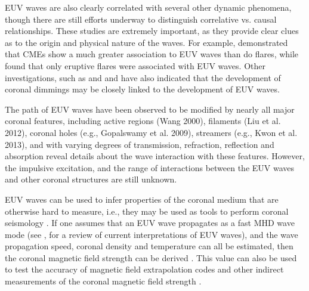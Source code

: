 EUV waves are also clearly correlated with several other dynamic
phenomena, though there are still efforts underway to distinguish
correlative vs. causal relationships.  These studies are extremely
important, as they provide clear clues as to the origin and physical
nature of the waves.  For example, \cite{2002ApJ...569.1009B}
demonstrated that CMEs show a much greater association to EUV waves
than do flares, while \cite{2006ApJ...641L.153} found that only
eruptive flares were associated with EUV waves.  Other investigations,
such as \cite{2000SoPh..193..161T} and \cite{2004A&A...427..705Z} and
\cite{2010ApJ...709..369P} have also indicated that the development of
coronal dimmings may be closely linked to the development of EUV
waves.

The path of EUV waves have been observed to be modified by nearly all
major coronal features, including active regions (Wang 2000),
filaments (Liu et al. 2012), coronal holes (e.g., Gopalswamy et
al. 2009), streamers (e.g., Kwon et al. 2013), and with varying
degrees of transmission, refraction, reflection and absorption reveal
details about the wave interaction with these features. However, the
impulsive excitation, and the range of interactions between the EUV
waves and other coronal structures are still unknown.

EUV waves can be used to infer properties of the coronal medium that
are otherwise hard to measure, i.e., they may be used as tools to
perform coronal seismology \citep{1970PASJ...22..341U}.  If one
assumes that an EUV wave propagates as a fast MHD wave mode (see
\cite{2011SSRv..158..365G}, for a review of current interpretations of
EUV waves), and the wave propagation speed, coronal density and
temperature can all be estimated, then the coronal magnetic field
strength can be derived \cite{2005LRSP....2....3N}.  This value can
also be used to test the accuracy of magnetic field extrapolation
codes \citep{2008ApJ...675.1637S} and other indirect measurements of
the coronal magnetic field strength \citep{2007Sci...317.1192T}.
